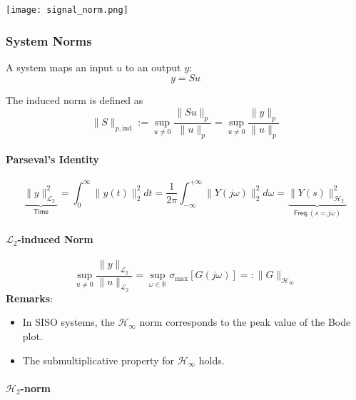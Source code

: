 \begin{center}
    \texttt{[image: signal\_norm.png]}
\end{center}

\newpar{}
\subsubsection{System Norms}
A system maps an input $u$ to an output $y$:
\noindent\begin{equation*}
    y=Su
\end{equation*}

The induced norm is defined as
\noindent\begin{equation*}
    \|S\|_{p,\mathrm{ind}}:=\sup_{u\neq0}\frac{\|Su\|_p}{\|u\|_p}=\sup_{u\neq0}\frac{\|y\|_p}{\|u\|_p}
\end{equation*}

\newpar{}
\paragraph{Parseval's Identity}
\noindent\begin{equation*}
    \underbrace{\|y\|_{\mathcal{L}_2}^2}_{\textsf{Time}}=\int_0^\infty\|y(t)\|_2^2 dt=\frac1{2\pi}\int_{-\infty}^{+\infty}\|Y(j\omega)\|_2^2 d\omega=\underbrace{\|Y(s)\|_{\mathcal{H}_2}^2}_{\textsf{Freq.} (s=j\omega)}
\end{equation*}

\paragraph[L2-induced Norm]{$\mathcal{L}_2$-induced Norm}
\noindent\begin{equation*}
    \sup_{u\neq0}\frac{\|y\|_{\mathcal{L}_2}}{\|u\|_{\mathcal{L}_2}}=\sup_{\omega\in\mathbb{R}}\sigma_{\max}[G(j\omega)]=:\|G\|_{\mathcal{H}_\infty}
\end{equation*}
\textbf{Remarks}:
\begin{itemize}
    \item In SISO systems, the $\mathcal{H}_\infty$ norm corresponds to the peak value of the Bode plot.
    \item The submultiplicative property for $\mathcal{H}_\infty$ holds.
\end{itemize}

\paragraph[H2-induced Norm]{$\mathcal{H}_2$-norm}

